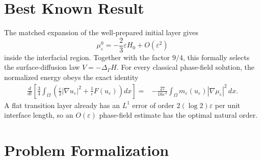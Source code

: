 \documentclass[10pt,a4paper]{article}
\theoremstyle{definition}
\begin{document}
\section{Best Known Result}

The matched expansion of the well-prepared initial layer gives
\begin{equation}
  \mu_\varepsilon^0
  =
  -\frac{2}{3}\varepsilon H_0+O(\varepsilon^2)
\end{equation}
inside the interfacial region. Together with the factor $9/4$, this formally
selects the surface-diffusion law $V=-\Delta_\Gamma H$. For every classical
phase-field solution, the normalized energy obeys the exact identity
\begin{equation}
\begin{split}
  \frac{d}{dt}
  \left[
    \frac{3}{4}\int_\Omega
    \left(
      \frac{\varepsilon}{2}|\nabla u_\varepsilon|^2
      +\frac{1}{\varepsilon}F(u_\varepsilon)
    \right)dx
  \right]
  ={}&
  -\frac{27}{16\varepsilon^3}
  \int_\Omega
  m_\varepsilon(u_\varepsilon)|\nabla\mu_\varepsilon|^2\,dx.
\end{split}
\end{equation}
A flat transition layer already has an $L^1$ error of order
$2(\log2)\varepsilon$ per unit interface length, so an $O(\varepsilon)$
phase-field estimate has the optimal natural order.

\newpage
\section{Problem Formalization}
\end{document}
